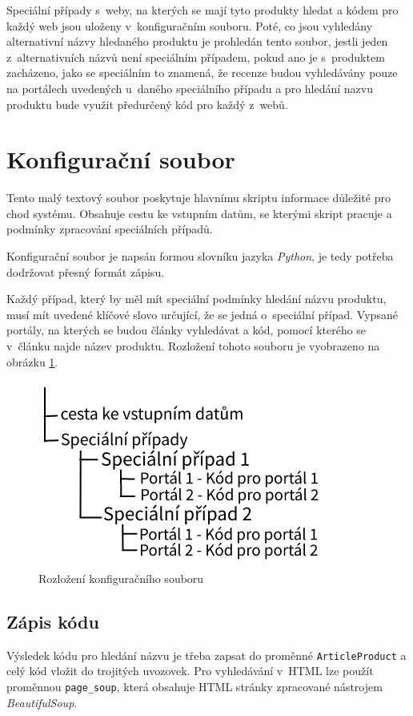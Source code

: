 Speciální případy s~weby, na kterých se mají tyto produkty hledat a kódem pro každý web jsou uloženy v~konfiguračním souboru. Poté, co jsou vyhledány alternativní názvy hledaného produktu je prohledán tento soubor, jestli jeden z~alternativních názvů není speciálním případem, pokud ano je s~produktem zacházeno, jako se speciálním to znamená, že recenze budou vyhledávány pouze na portálech uvedených u~daného speciálního případu a pro hledání nazvu produktu bude využit předurčený kód pro každý z~webů. 

\section{Konfigurační soubor}

Tento malý textový soubor poskytuje hlavnímu skriptu informace důležité pro chod systému. Obsahuje cestu ke vstupním datům, se kterými skript pracuje a podmínky zpracování speciálních případů.

Konfigurační soubor je napsán formou slovníku jazyka \textit{Python}, je tedy potřeba dodržovat přesný formát zápisu.

Každý případ, který by měl mít speciální podmínky hledání názvu produktu, musí mít uvedené klíčové slovo určující, že se jedná o~speciální případ. Vypsané portály, na kterých se budou články vyhledávat a kód, pomocí kterého se v~článku najde název produktu. Rozložení tohoto souboru je vyobrazeno na obrázku \ref{fig:ukazka_konfigu}. 

\begin{figure}[h]
    \centering
    \includegraphics[scale=0.45]{obrazky-figures/ukazka_konfigu.png}
    \caption{Rozložení konfiguračního souboru}
    \label{fig:ukazka_konfigu}
\end{figure}


\subsection*{Zápis kódu}
Výsledek kódu pro hledání názvu je třeba zapsat do proměnné \verb|ArticleProduct| a celý kód vložit do trojitých uvozovek. Pro vyhledávání v~HTML lze použít proměnnou \verb|page_soup|, která obsahuje HTML stránky zpracované nástrojem \textit{BeautifulSoup}.

